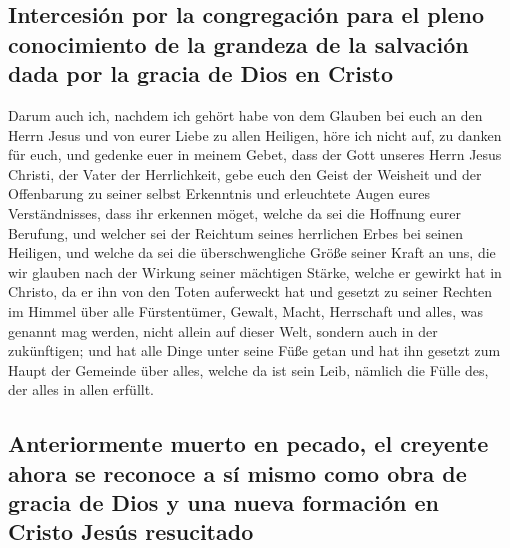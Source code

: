 \hypertarget{intercesiuxf3n-por-la-congregaciuxf3n-para-el-pleno-conocimiento-de-la-grandeza-de-la-salvaciuxf3n-dada-por-la-gracia-de-dios-en-cristo}{%
\subsection{Intercesión por la congregación para el pleno conocimiento
de la grandeza de la salvación dada por la gracia de Dios en
Cristo}\label{intercesiuxf3n-por-la-congregaciuxf3n-para-el-pleno-conocimiento-de-la-grandeza-de-la-salvaciuxf3n-dada-por-la-gracia-de-dios-en-cristo}}

 Darum auch ich, nachdem ich gehört habe von dem Glauben
bei euch an den Herrn Jesus und von eurer Liebe zu allen Heiligen,
 höre ich nicht auf, zu danken für euch, und gedenke euer
in meinem Gebet,  dass der Gott unseres Herrn Jesus
Christi, der Vater der Herrlichkeit, gebe euch den Geist der Weisheit
und der Offenbarung zu seiner selbst Erkenntnis  und
erleuchtete Augen eures Verständnisses, dass ihr erkennen möget, welche
da sei die Hoffnung eurer Berufung, und welcher sei der Reichtum seines
herrlichen Erbes bei seinen Heiligen,  und welche da sei
die überschwengliche Größe seiner Kraft an uns, die wir glauben nach der
Wirkung seiner mächtigen Stärke,  welche er gewirkt hat
in Christo, da er ihn von den Toten auferweckt hat und gesetzt zu seiner
Rechten im Himmel  über alle Fürstentümer, Gewalt, Macht,
Herrschaft und alles, was genannt mag werden, nicht allein auf dieser
Welt, sondern auch in der zukünftigen;  und hat alle
Dinge unter seine Füße getan und hat ihn gesetzt zum Haupt der Gemeinde
über alles,  welche da ist sein Leib, nämlich die Fülle
des, der alles in allen erfüllt.

\hypertarget{anteriormente-muerto-en-pecado-el-creyente-ahora-se-reconoce-a-suxed-mismo-como-obra-de-gracia-de-dios-y-una-nueva-formaciuxf3n-en-cristo-jesuxfas-resucitado}{%
\subsection{Anteriormente muerto en pecado, el creyente ahora se
reconoce a sí mismo como obra de gracia de Dios y una nueva formación en
Cristo Jesús
resucitado}\label{anteriormente-muerto-en-pecado-el-creyente-ahora-se-reconoce-a-suxed-mismo-como-obra-de-gracia-de-dios-y-una-nueva-formaciuxf3n-en-cristo-jesuxfas-resucitado}}

